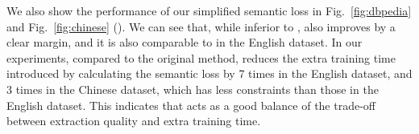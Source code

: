 We also show the performance of our simplified semantic loss in Fig.~\ref{fig:dbpedia} and Fig.~\ref{fig:chinese} (\SLsimple).
We can see that, while inferior to \SL, \SLsimple also improves \base by a clear margin, and it is also comparable to \ILP in the English dataset.
In our experiments, compared to the original \SL method, \SLsimple reduces the extra training time introduced by calculating the semantic loss by 7 times in the English dataset, and 3 times in the Chinese dataset, which has less constraints than those in the English dataset.
This indicates that \SLsimple acts as a good balance of the trade-off between extraction quality and extra training time.


